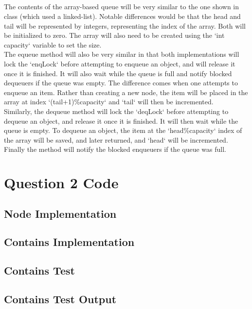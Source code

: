 \documentclass[11pt]{article}
\begin{document}
\subsection{}
The contents of the array-based queue will be very similar to the one shown in class (which used a linked-list). Notable differences 
would be that the head and tail will be represented by integers, representing the index of the array. Both will be initialized to zero. 
The array will also need to be created using the `int capacity` variable to set the size.\\
The equeue method will also be very similar in that both implementations will lock the `enqLock` before attempting to enqueue an object, 
and will release it once it is finished. It will also wait while the queue is full and notify blocked dequeuers if the queue was empty. 
The difference comes when one attempts to enqueue an item. Rather than creating a new node, the item will be placed in the array at index 
`(tail+1)\%capacity` and `tail` will then be incremented.\\
Similarly, the dequeue method will lock the `deqLock` before attempting to dequeue an object, and release it once it is finished. It will 
then wait while the queue is empty. To dequeue an object, the item at the `head\%capacity` index of the array will be saved, and later 
returned, and `head` will be incremented. Finally the method will notify the blocked enqueuers if the queue was full.

\subsection{}


\appendix
\section{Question 2 Code}
\subsection{Node Implementation}

\subsection{Contains Implementation}

\subsection{Contains Test}

\subsection{Contains Test Output}

\end{document}
